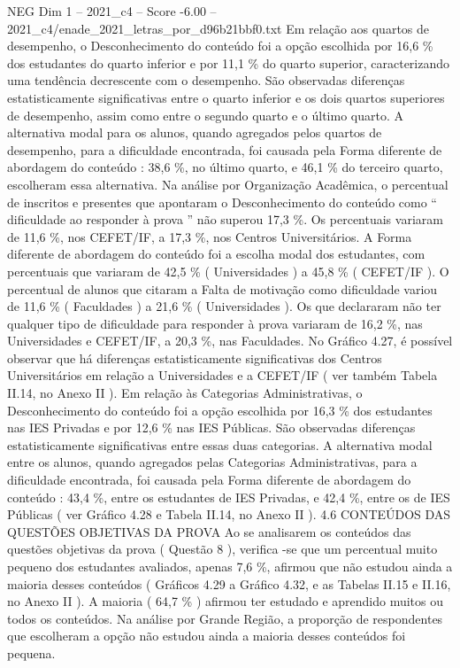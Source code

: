 \begin{textsample}{NEG Dim 1 – 2021\_c4 – Score -6.00 – 2021\_c4/enade\_2021\_letras\_por\_d96b21bbf0.txt}
Em relação aos quartos de desempenho, o Desconhecimento do conteúdo foi a opção escolhida por 16,6 \% dos estudantes do quarto inferior e por 11,1 \% do quarto superior, caracterizando uma tendência decrescente com o desempenho.
São observadas diferenças estatisticamente significativas entre o quarto inferior e os dois quartos superiores de desempenho, assim como entre o segundo quarto e o último quarto.
A alternativa modal para os alunos, quando agregados pelos quartos de desempenho, para a dificuldade encontrada, foi causada pela Forma diferente de abordagem do conteúdo : 38,6 \%, no último quarto, e 46,1 \% do terceiro quarto, escolheram essa alternativa.
Na análise por Organização Acadêmica, o percentual de inscritos e presentes que apontaram o Desconhecimento do conteúdo como “ dificuldade ao responder à prova ” não superou 17,3 \%.
Os percentuais variaram de 11,6 \%, nos CEFET/IF, a 17,3 \%, nos Centros Universitários.
A Forma diferente de abordagem do conteúdo foi a escolha modal dos estudantes, com percentuais que variaram de 42,5 \% ( Universidades ) a 45,8 \% ( CEFET/IF ).
O percentual de alunos que citaram a Falta de motivação como dificuldade variou de 11,6 \% ( Faculdades ) a 21,6 \% ( Universidades ).
Os que declararam não ter qualquer tipo de dificuldade para responder à prova variaram de 16,2 \%, nas Universidades e CEFET/IF, a 20,3 \%, nas Faculdades.
No Gráfico 4.27, é possível observar que há diferenças estatisticamente significativas dos Centros Universitários em relação a Universidades e a CEFET/IF ( ver também Tabela II.14, no Anexo II ).
Em relação às Categorias Administrativas, o Desconhecimento do conteúdo foi a opção escolhida por 16,3 \% dos estudantes nas IES Privadas e por 12,6 \% nas IES Públicas.
São observadas diferenças estatisticamente significativas entre essas duas categorias.
A alternativa modal entre os alunos, quando agregados pelas Categorias Administrativas, para a dificuldade encontrada, foi causada pela Forma diferente de abordagem do conteúdo : 43,4 \%, entre os estudantes de IES Privadas, e 42,4 \%, entre os de IES Públicas ( ver Gráfico 4.28 e Tabela II.14, no Anexo II ). 4.6 CONTEÚDOS DAS QUESTÕES OBJETIVAS DA PROVA Ao se analisarem os conteúdos das questões objetivas da prova ( Questão 8 ), verifica -se que um percentual muito pequeno dos estudantes avaliados, apenas 7,6 \%, afirmou que não estudou ainda a maioria desses conteúdos ( Gráficos 4.29 a Gráfico 4.32, e as Tabelas II.15 e II.16, no Anexo II ).
A maioria ( 64,7 \% ) afirmou ter estudado e aprendido muitos ou todos os conteúdos.
Na análise por Grande Região, a proporção de respondentes que escolheram a opção não estudou ainda a maioria desses conteúdos foi pequena.

\end{textsample}
